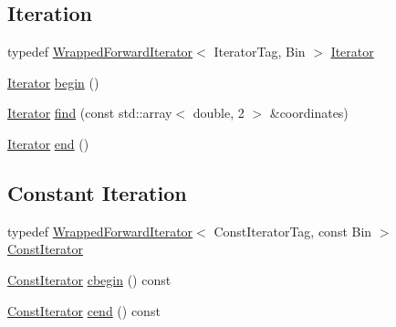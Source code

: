 \subsection*{Iteration}
\label{_amgrp86c1e32c05338b57578313d8a6fa892d}
 \begin{DoxyCompactItemize}
\item 
typedef \hyperlink{classeos_1_1WrappedForwardIterator}{WrappedForwardIterator}$<$ IteratorTag, Bin $>$ \hyperlink{classeos_1_1Histogram_3_012_01_4_a9ed06cf8cfcef9f4ed3b9786d48f76e4}{Iterator}
\item 
\hyperlink{classeos_1_1WrappedForwardIterator}{Iterator} \hyperlink{classeos_1_1Histogram_3_012_01_4_a707137db436a294fd3b1f04db0932f28}{begin} ()
\item 
\hyperlink{classeos_1_1WrappedForwardIterator}{Iterator} \hyperlink{classeos_1_1Histogram_3_012_01_4_a232eeac19611c37c38a41afa7cb7f32d}{find} (const std::array$<$ double, 2 $>$ \&coordinates)
\item 
\hyperlink{classeos_1_1WrappedForwardIterator}{Iterator} \hyperlink{classeos_1_1Histogram_3_012_01_4_a5a2a5bce976bb53ae5a168c91d5cdef2}{end} ()
\end{DoxyCompactItemize}
\subsection*{Constant Iteration}
\label{_amgrp54106a00af25f647851a54988d8beceb}
 \begin{DoxyCompactItemize}
\item 
typedef \hyperlink{classeos_1_1WrappedForwardIterator}{WrappedForwardIterator}$<$ ConstIteratorTag, const Bin $>$ \hyperlink{classeos_1_1Histogram_3_012_01_4_ad4594c8c5127b71c535b1389bcc2fdca}{ConstIterator}
\item 
\hyperlink{classeos_1_1WrappedForwardIterator}{ConstIterator} \hyperlink{classeos_1_1Histogram_3_012_01_4_a39f7bf7af2482f97390aeacbe6073f4c}{cbegin} () const 
\item 
\hyperlink{classeos_1_1WrappedForwardIterator}{ConstIterator} \hyperlink{classeos_1_1Histogram_3_012_01_4_a0029dc44ba45b97a35c694314db1df14}{cend} () const 
\end{DoxyCompactItemize}
